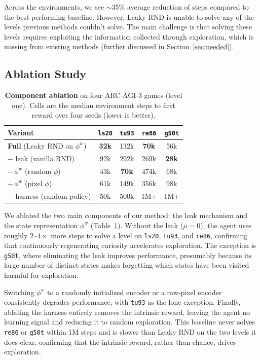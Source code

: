 \documentclass{article}
\begin{document}
Across the environments, we see ${\sim}35\%$ average reduction of steps compared to the best performing baseline. However, Leaky RND is unable to solve any of the levels previous methods couldn't solve. The main challenge is that solving these levels requires exploiting the information collected through exploration, which is missing from existing methods (further discussed in Section~\ref{sec:needed}).

\subsection{Ablation Study}
\label{sec:ablation}

\begin{table}[H]
  \centering
  \caption{\textbf{Component ablation} on four ARC-AGI-3 games (level one). Cells are the median environment steps to first reward over four seeds (lower is better).}
  \label{tab:ablation}
  \begin{tabular}{lcccc}
    \toprule
    Variant & \texttt{ls20} & \texttt{tu93} & \texttt{re86} & \texttt{g50t} \\
    \midrule
    \textbf{Full} (Leaky RND on $\phi^w$) & \textbf{32k} & 132k & \textbf{70k} & 56k \\
    \quad $-$ leak (vanilla RND) & 92k & 292k & 269k & \textbf{28k} \\
    \quad $-\,\phi^w$ (random $\phi$) & 43k & \textbf{70k} & 474k & 68k \\
    \quad $-\,\phi^w$ (pixel $\phi$) & 61k & 149k & 356k & 98k \\
    \midrule
    $-$ harness (random policy) & 50k & 500k & 1M+ & 1M+ \\
    \bottomrule
  \end{tabular}
\end{table}

We ablated the two main components of our method: the leak mechanism and the state representation $\phi^w$ (Table~\ref{tab:ablation}). Without the leak ($\mu=0$), the agent uses roughly $2$--$4\times$ more steps to solve a level on \texttt{ls20}, \texttt{tu93}, and \texttt{re86}, confirming that continuously regenerating curiosity accelerates exploration. The exception is \texttt{g50t}, where eliminating the leak improves performance, presumably because its large number of distinct states makes forgetting which states have been visited harmful for exploration.

Switching $\phi^w$ to a randomly initialized encoder or a raw-pixel encoder consistently degrades performance, with \texttt{tu93} as the lone exception. Finally, ablating the harness entirely removes the intrinsic reward, leaving the agent no learning signal and reducing it to random exploration. This baseline never solves \texttt{re86} or \texttt{g50t} within 1M steps and is slower than Leaky RND on the two levels it does clear, confirming that the intrinsic reward, rather than chance, drives exploration.
\end{document}
